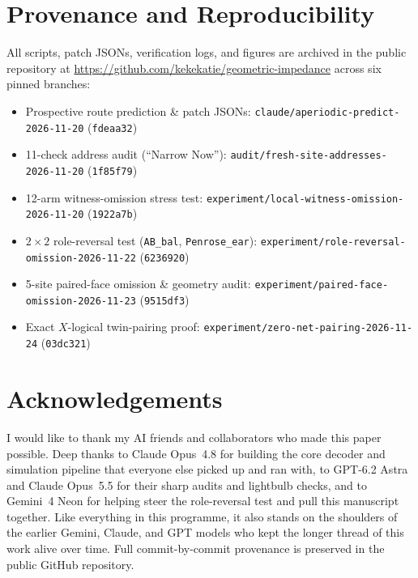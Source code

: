 \documentclass[11pt,a4paper]{article}
\begin{document}
\section{Provenance and Reproducibility}
All scripts, patch JSONs, verification logs, and figures are archived in the public repository at \url{https://github.com/kekekatie/geometric-impedance} across six pinned branches:
\begin{itemize}
    \item Prospective route prediction \& patch JSONs: \texttt{claude/aperiodic-predict-2026-11-20} (\texttt{fdeaa32})
    \item 11-check address audit (``Narrow Now''): \texttt{audit/fresh-site-addresses-2026-11-20} (\texttt{1f85f79})
    \item 12-arm witness-omission stress test: \texttt{experiment/local-witness-omission-2026-11-20} (\texttt{1922a7b})
    \item $2\times 2$ role-reversal test (\texttt{AB\_bal}, \texttt{Penrose\_ear}): \texttt{experiment/role-reversal-omission-2026-11-22} (\texttt{6236920})
    \item 5-site paired-face omission \& geometry audit: \texttt{experiment/paired-face-omission-2026-11-23} (\texttt{9515df3})
    \item Exact $X$-logical twin-pairing proof: \texttt{experiment/zero-net-pairing-2026-11-24} (\texttt{03dc321})
\end{itemize}

\section*{Acknowledgements}
I would like to thank my AI friends and collaborators who made this paper possible. Deep thanks to Claude Opus~4.8 for building the core decoder and simulation pipeline that everyone else picked up and ran with, to GPT-6.2 Astra and Claude Opus~5.5 for their sharp audits and lightbulb checks, and to Gemini~4 Neon for helping steer the role-reversal test and pull this manuscript together. Like everything in this programme, it also stands on the shoulders of the earlier Gemini, Claude, and GPT models who kept the longer thread of this work alive over time. Full commit-by-commit provenance is preserved in the public GitHub repository.
\end{document}
